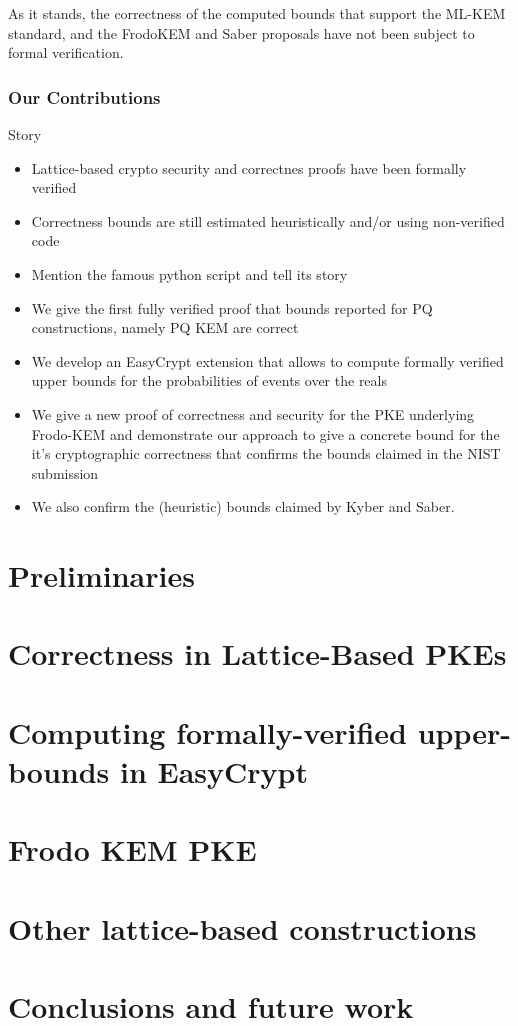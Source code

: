 \documentclass[conference,compsoc]{IEEEtran}
\begin{document}
As it stands, the correctness of the computed bounds that support the ML-KEM standard, and the FrodoKEM and Saber proposals have not been subject to formal verification. 

\subsubsection*{Our Contributions}


Story
\begin{itemize}
\item Lattice-based crypto security and correctnes proofs have been formally verified
\item Correctness bounds are still estimated heuristically and/or using non-verified code
\item Mention the famous python script and tell its story
\item We give the first fully verified proof that bounds reported for PQ constructions, namely PQ KEM are correct
\item We develop an EasyCrypt extension that allows to compute formally verified upper bounds for the probabilities of events over the reals
\item We give a new proof of correctness and security for the PKE underlying Frodo-KEM and demonstrate our approach to give a concrete bound for the it's cryptographic correctness that confirms the bounds claimed in the NIST submission
\item We also confirm the (heuristic) bounds claimed by Kyber and Saber.
\end{itemize}

\section{Preliminaries}

\section{Correctness in Lattice-Based PKEs}

\section{Computing formally-verified upper-bounds in EasyCrypt}

\section{Frodo KEM PKE}

\section{Other lattice-based constructions}

\section{Conclusions and future work}



\end{document}
